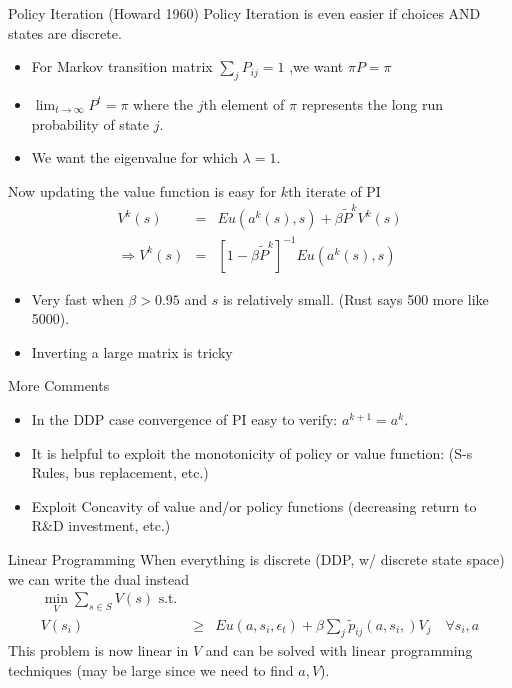 \documentclass[aspectratio=169,11pt]{beamer}
\begin{document}
\begin{frame}{Policy Iteration (Howard 1960)}
Policy Iteration is even easier if choices AND states are discrete.
\begin{itemize}
\item For Markov transition matrix $\sum_j P_{ij} =1$ ,we want $\pi P = \pi$
\item $\lim_{t \rightarrow \infty} P^t = \pi$ where the $j$th element of $\pi$ represents the long run probability of state $j$.
\item We want the eigenvalue for which $\lambda = 1$.
\end{itemize}
Now updating the value function is easy for $k$th iterate of PI
\begin{eqnarray*}
V^k(s) &=& Eu(a^k(s),s) + \beta \tilde{P}^k V^k(s)\\
\Rightarrow V^k(s) &=& [1 - \beta \tilde{P}^k]^{-1} Eu(a^k(s),s)
\end{eqnarray*}
\vspace{-1cm}
\begin{itemize}
\item Very fast when $\beta > 0.95$ and $s$ is relatively small. (Rust says 500 more like 5000).
\item Inverting a large matrix is tricky
\end{itemize}
\end{frame}


\begin{frame}{More Comments }
\begin{itemize}
\item In the DDP case convergence of PI easy to verify: $a^{k+1} = a^k$.
\item It is helpful to exploit the monotonicity of policy or value function: (S-s Rules, bus replacement, etc.)
\item Exploit Concavity of value and/or policy functions (decreasing return to R\&D investment, etc.) 
\end{itemize}
\end{frame}


\begin{frame}{Linear Programming}
When everything is discrete (DDP, w/ discrete state space) we can write the dual instead
\begin{eqnarray*}
\min_{V} \sum_{s \in S} V(s) \mbox{ s.t. }&& \\
V(s_i) &\geq& Eu(a,s_i,\epsilon_t)  + \beta \sum_j \tilde{p}_{ij}(a,s_i,) V_j \quad \forall s_i, a
\end{eqnarray*}
This problem is now linear in $V$ and can be solved with linear programming techniques (may be large since we need to find $a,V$).
\end{frame}
\end{document}
